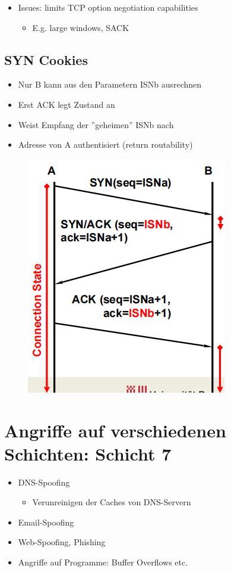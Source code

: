 \documentclass[openany]{book}
\begin{document}
\begin{itemize}
    \item Issues: limits TCP option negotiation capabilities
    \begin{itemize}
        \item E.g. large windows, SACK
    \end{itemize}
\end{itemize}

\newpage

\subsection{SYN Cookies}

\begin{itemize}
    \item Nur B kann aus den Parametern ISNb ausrechnen
    \item Erst ACK legt Zustand an
    \item Weist Empfang der ''geheimen'' ISNb nach
    \item Adresse von A authentisiert (return routability)
\end{itemize}

\begin{figure}[h!]
    \centering
    \includegraphics[width=0.45\linewidth]{Pics/SYNCookie2.PNG}
\end{figure}

\section{Angriffe auf verschiedenen Schichten: Schicht 7}

\begin{itemize}
    \item DNS-Spoofing
    \begin{itemize}
        \item Verunreinigen der Caches von DNS-Servern
    \end{itemize}
    \item Email-Spoofing
    \item Web-Spoofing, Phishing
    \item Angriffe auf Programme: Buffer Overflows etc.
\end{itemize}
\end{document}
